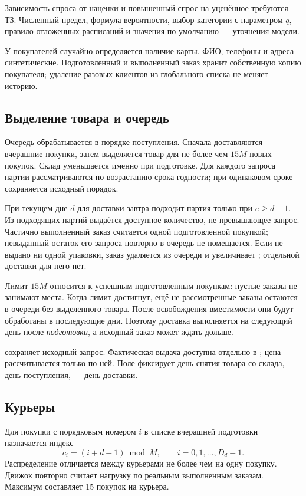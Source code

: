 Зависимость спроса от наценки и повышенный спрос на уценённое требуются ТЗ.
Численный предел, формула вероятности, выбор категории с параметром $q$,
правило отложенных расписаний и значения по умолчанию --- уточнения модели.

У покупателей случайно определяется наличие карты. ФИО, телефоны и адреса
синтетические. Подготовленный и выполненный заказ хранит собственную копию
покупателя; удаление разовых клиентов из глобального списка не меняет историю.

\subsection{Выделение товара и очередь}
Очередь обрабатывается в порядке поступления. Сначала доставляются вчерашние
покупки, затем выделяется товар для не более чем $15M$ новых покупок.
Склад уменьшается именно при подготовке. Для каждого запроса партии
рассматриваются по возрастанию срока годности; при одинаковом сроке
сохраняется исходный порядок.

При текущем дне $d$ для доставки завтра подходит партия только при $e\geq d+1$.
Из подходящих партий выдаётся доступное количество, не превышающее запрос.
Частично выполненный заказ считается одной подготовленной покупкой;
невыданный остаток его запроса повторно в очередь не помещается.
Если не выдано ни одной упаковки, заказ удаляется из очереди и увеличивает
; отдельной доставки для него нет.

Лимит $15M$ относится к успешным подготовленным покупкам: пустые заказы
не занимают места. Когда лимит достигнут, ещё не рассмотренные заказы
остаются в очереди без выделенного товара. После освобождения вместимости
они будут обработаны в последующие дни. Поэтому доставка выполняется
на следующий день после \emph{подготовки}, а исходный заказ может ждать дольше.

 сохраняет исходный запрос. Фактическая выдача доступна
отдельно в ; цена рассчитывается только по ней.
Поле  фиксирует день снятия товара со склада,
 --- день поступления,  --- день доставки.

\subsection{Курьеры}
Для покупки с порядковым номером $i$ в списке вчерашней подготовки
назначается индекс
\begin{equation}
  c_i=(i+d-1)\bmod M, \qquad i=0,1,\ldots,D_d-1.
\end{equation}
Распределение отличается между курьерами не более чем на одну покупку.
Движок повторно считает нагрузку по реальным выполненным заказам.
Максимум составляет 15 покупок на курьера.

